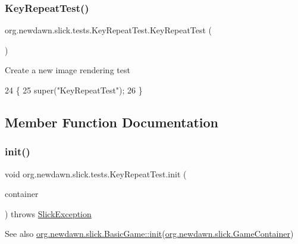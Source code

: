 \subsubsection{\texorpdfstring{Key\+Repeat\+Test()}{KeyRepeatTest()}}
{\footnotesize\ttfamily org.\+newdawn.\+slick.\+tests.\+Key\+Repeat\+Test.\+Key\+Repeat\+Test (\begin{DoxyParamCaption}{ }\end{DoxyParamCaption})\hspace{0.3cm}{\ttfamily [inline]}}

Create a new image rendering test 
\begin{DoxyCode}
24                            \{
25         super(\textcolor{stringliteral}{"KeyRepeatTest"});
26     \}
\end{DoxyCode}


\subsection{Member Function Documentation}
\mbox{\label{classorg_1_1newdawn_1_1slick_1_1tests_1_1_key_repeat_test_a16457bc19cfcfd8d322b2fefc4e0799f}} 
\subsubsection{\texorpdfstring{init()}{init()}}
{\footnotesize\ttfamily void org.\+newdawn.\+slick.\+tests.\+Key\+Repeat\+Test.\+init (\begin{DoxyParamCaption}\item[{\mbox{\hyperlink{classorg_1_1newdawn_1_1slick_1_1_game_container}{Game\+Container}}}]{container }\end{DoxyParamCaption}) throws \mbox{\hyperlink{classorg_1_1newdawn_1_1slick_1_1_slick_exception}{Slick\+Exception}}\hspace{0.3cm}{\ttfamily [inline]}}

\begin{DoxySeeAlso}{See also}
\mbox{\hyperlink{classorg_1_1newdawn_1_1slick_1_1_basic_game_a8af0900217e4d389249f71367b22d114}{org.\+newdawn.\+slick.\+Basic\+Game\+::init}}(\mbox{\hyperlink{classorg_1_1newdawn_1_1slick_1_1_game_container}{org.\+newdawn.\+slick.\+Game\+Container}}) 
\end{DoxySeeAlso}


